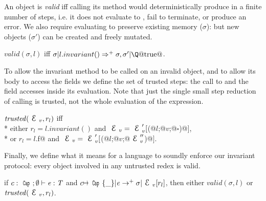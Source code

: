 \noindent An object is \emph{valid} iff calling its \Q@invariant@ method would
deterministically produce \Q@true@ in a finite number of steps, i.e. it does not evaluate to \Q@false@, fail to terminate, or produce an error.
We also require evaluating \Q@invariant@ to preserve existing memory ($\sigma$): but new objects ($\sigma'$) can be created and freely mutated.

\indent$valid(\sigma,l)$ iff $\sigma | l.invariant()\Rightarrow^+ \sigma,\sigma' | \text{\Q@true@}$.\loseSpace


\noindent 
To allow the invariant method to be called on an invalid object, and to allow its body to access the fields we define the set of trusted steps:
the call to \Q@invariant@ and the field accesses inside its evaluation.
Note that just the single small step reduction
of calling \Q@invariant@ is trusted, not the whole evaluation of the \Q@invariant@ expression.

\loseSpace
\noindent $\mathit{trusted}(\ctx_v,r_l)$ iff\\*
\indent either
$r_l=l.invariant()$ and
 $\ctx_v=\ctx_v'[$\Q@M(@$l$\Q@;@$v$\Q@;@$\square$\Q@)@$]$,\\*
\indent or
$r_l=l$\Q@.f@ and
 $\ctx_v=\ctx_v'[$\Q@M(@$l$\Q@;@$v$\Q@;@$\ctx_v''$\Q@)@$]$.
\loseSpace

\noindent Finally, we define what it means for a language to soundly enforce our invariant protocol: every object involved in any untrusted redex is valid.

\begin{theorem}[Soundness]
if $c:\Kw{Cap};\emptyset\vdash \e: \T$ and
$c\mapsto\Kw{Cap}\{\_\}|\e\rightarrow^+ \sigma|\ctx_v[r_l]$, then
either $valid(\sigma,l)$ or $\mathit{trusted}(\ctx_v,r_l)$.
\end{theorem}



